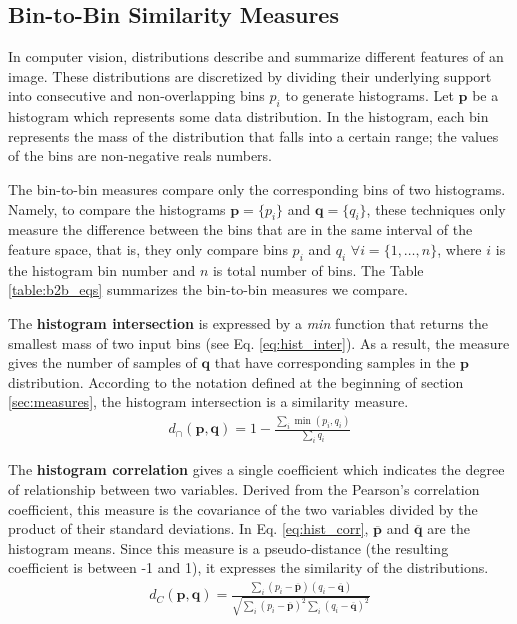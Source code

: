 \subsection{Bin-to-Bin Similarity Measures}
In computer vision, distributions describe and summarize different features of an image. These distributions are discretized by dividing their underlying support into consecutive and non-overlapping bins $p_i$ to generate histograms. Let $\mathbf{p}$ be a histogram which represents some data distribution. In the histogram, each bin represents the mass of the distribution that falls into a certain range; the values of the bins are non-negative reals numbers. 

The bin-to-bin measures compare only the corresponding bins of two histograms. Namely, to compare the histograms  $\mathbf{p} = \{p_i\}$ and $\mathbf{q} = \{q_i\}$, these techniques only measure the difference between the bins that are in the same interval of the feature space, that is, they only compare bins  $p_i$ and $q_i$ $\forall i=\{1, \ldots, n\}$, where $i$ is the histogram bin number and $n$ is total number of bins. The Table \ref{table:b2b_eqs} summarizes the bin-to-bin measures we compare.

The \textbf{histogram intersection} \citep{Swain.Ballard:IJCV:1991} is expressed by a \textit{min} function that returns the smallest mass of two input bins (see Eq. \ref{eq:hist_inter}). As a result, the measure gives the number of samples of $\mathbf{q}$ that have corresponding samples in the $\mathbf{p}$ distribution. According to the notation defined at the beginning of section \ref{sec:measures}, the histogram intersection is a similarity measure.
\begin{eqnarray}
d_{\cap}(\mathbf{p}, \mathbf{q}) = 1 - \frac{\sum_{i}\min(p_i, q_i)}{\sum_{i}q_i} \label{eq:hist_inter}
\end{eqnarray}

The \textbf{histogram correlation} gives a single coefficient which indicates the degree of relationship between two variables. Derived from the Pearson's correlation coefficient, this measure is the covariance of the two variables divided by the product of their standard deviations. In Eq. \ref{eq:hist_corr}, $\overline{\mathbf{p}}$ and $\overline{\mathbf{q}}$ are the histogram means. Since this measure is a pseudo-distance (the resulting coefficient is between -1 and 1), it expresses the similarity of the distributions.  
\begin{eqnarray}
d_{C}(\mathbf{p}, \mathbf{q}) = \frac{\sum_{i}(p_i - \overline{\mathbf{p}})(q_i - \overline{\mathbf{q}})}{\sqrt{\sum_{i}(p_i - \overline{\mathbf{p}})^{2}\sum_{i}(q_i - \overline{\mathbf{q}})^{2}}} \label{eq:hist_corr}
\end{eqnarray}


